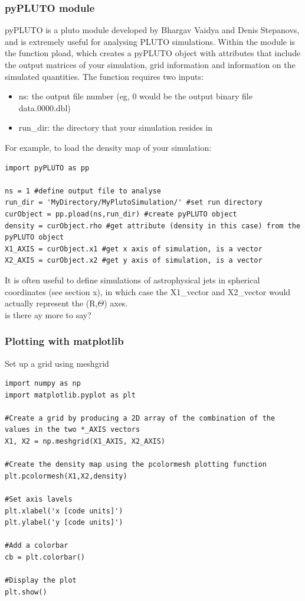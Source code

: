 \documentclass[12pt]{article}
\begin{document}
\subsubsection{pyPLUTO module}
pyPLUTO is a pluto module developed by Bhargav Vaidya and Denis Stepanovs, and is extremely useful for analysing PLUTO simulations. Within the module is the function pload, which creates a pyPLUTO object with attributes that include the output matrices of your simulation, grid information and information on the simulated quantities. The function requires two inputs:
\begin{itemize}
\item ns: the output file number (eg, 0 would be the output binary file data.0000.dbl)
\item run\_dir: the directory that your simulation resides in
\end{itemize}
For example, to load the density map of your simulation:
\begin{lstlisting}
import pyPLUTO as pp

ns = 1 #define output file to analyse
run_dir = 'MyDirectory/MyPlutoSimulation/' #set run directory
curObject = pp.pload(ns,run_dir) #create pyPLUTO object
density = curObject.rho #get attribute (density in this case) from the pyPLUTO object
X1_AXIS = curObject.x1 #get x axis of simulation, is a vector
X2_AXIS = curObject.x2 #get y axis of simulation, is a vector
\end{lstlisting}
It is often useful to define simulations of astrophysical jets in spherical coordinates (see section x), in which case the X1\_vector and X2\_vector would actually represent the (R,$\Theta$) axes.\\
is there ay more to say?

\subsubsection{Plotting with matplotlib}

Set up a grid using meshgrid
\begin{lstlisting}
import numpy as np
import matplotlib.pyplot as plt

#Create a grid by producing a 2D array of the combination of the values in the two *_AXIS vectors
X1, X2 = np.meshgrid(X1_AXIS, X2_AXIS)

#Create the density map using the pcolormesh plotting function 
plt.pcolormesh(X1,X2,density)

#Set axis lavels
plt.xlabel('x [code units]')
plt.ylabel('y [code units]')

#Add a colorbar
cb = plt.colorbar()

#Display the plot
plt.show()
\end{lstlisting}
\end{document}

